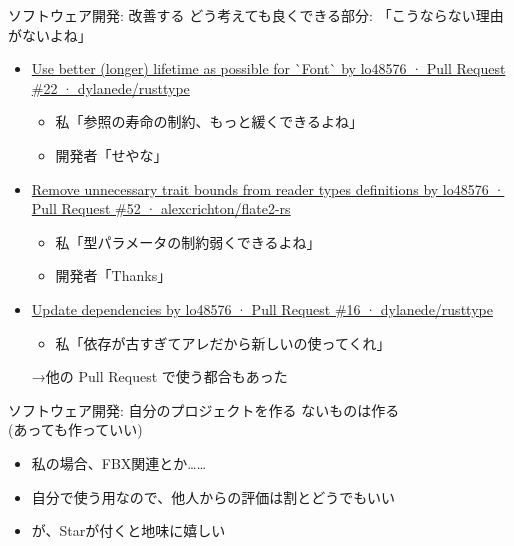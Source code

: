 \documentclass[
        unicode%
    ]{beamer}
\begin{document}
\begin{frame}{ソフトウェア開発: 改善する}
    どう考えても良くできる部分: 「こうならない理由がないよね」

    \begin{itemize}
        \item \href{https://github.com/dylanede/rusttype/pull/22}{Use better (longer) lifetime as possible for \`{}Font\`{} by lo48576 · Pull Request \#22 · dylanede/rusttype}
            \begin{itemize}
                \item 私「参照の寿命の制約、もっと緩くできるよね」
                \item 開発者「せやな」
            \end{itemize}
        \item \href{https://github.com/alexcrichton/flate2-rs/pull/52}{Remove unnecessary trait bounds from reader types definitions by lo48576 · Pull Request \#52 · alexcrichton/flate2-rs}
            \begin{itemize}
                \item 私「型パラメータの制約弱くできるよね」
                \item 開発者「Thanks」
            \end{itemize}
        \item \href{https://github.com/dylanede/rusttype/pull/16}{Update dependencies by lo48576 · Pull Request \#16 · dylanede/rusttype}
            \begin{itemize}
                \item 私「依存が古すぎてアレだから新しいの使ってくれ」
            \end{itemize}
            →他の Pull Request で使う都合もあった
    \end{itemize}
\end{frame}

\begin{frame}{ソフトウェア開発: 自分のプロジェクトを作る}
    ないものは作る \\
    (あっても作っていい)

    \begin{itemize}
        \item 私の場合、FBX関連とか……
        \item 自分で使う用なので、他人からの評価は割とどうでもいい
        \item が、Starが付くと地味に嬉しい
    \end{itemize}
\end{frame}
\end{document}
